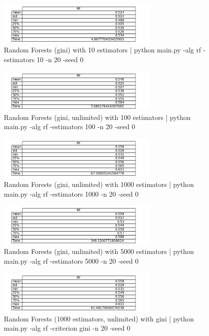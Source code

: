 \documentclass{article}
\begin{document}
\begin{figure}
\begin{center}
\includegraphics[width=8cm]{images/rf_10}
\caption{Random Forests (gini) with 10 estimators | python main.py -alg rf -estimators 10 -n 20 -seed 0}
\end{center}
\end{figure}
\begin{figure}
\begin{center}
\includegraphics[width=8cm]{images/rf_100}
\caption{Random Forests (gini, unlimited) with 100 estimators | python main.py -alg rf -estimators 100 -n 20 -seed 0}
\end{center}
\end{figure}
\begin{figure}
\begin{center}
\includegraphics[width=8cm]{images/rf_1000}
\caption{Random Forests (gini, unlimited) with 1000 estimators | python main.py -alg rf -estimators 1000 -n 20 -seed 0}
\end{center}
\end{figure}
\begin{figure}
\begin{center}
\includegraphics[width=8cm]{images/rf_5000}
\caption{Random Forests (gini, unlimited) with 5000 estimators | python main.py -alg rf -estimators 5000 -n 20 -seed 0}
\end{center}
\end{figure}
\begin{figure}
\begin{center}
\includegraphics[width=8cm]{images/rf_gini}
\caption{Random Forests (1000 estimators, unlimited) with gini | python main.py -alg rf -criterion gini -n 20 -seed 0}
\end{center}
\end{figure}
\end{document}
